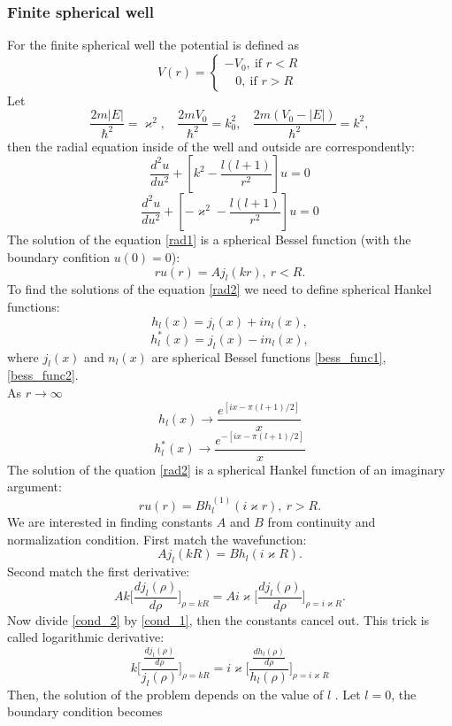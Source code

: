 \documentclass[a4paper, 12pt]{article}
\begin{document}
\subsubsection{Finite spherical well}
For the finite spherical well the  potential is defined as
$$V(r)=\begin{cases}
-V_0, ~\text{if } r< R\\
~~~~0, ~\text{if } r>R
\end{cases}$$
Let
$$\frac{2m|E|}{\hbar^2} = \varkappa^2, ~~~~\frac{2m V_0}{\hbar^2}=k_0^2, ~~~~\frac{2m(V_0-|E|)}{\hbar^2} =k^2,$$
then the radial equation inside of the well and outside are correspondently:
\begin{equation}\label{rad1}
	\frac{d^2 u}{du^2}+[k^2-\frac{l(l+1)}{r^2}]u=0
\end{equation}
\begin{equation}\label{rad2}
	\frac{d^2 u}{du^2}+[-\varkappa^2-\frac{l(l+1)}{r^2}]u=0
\end{equation}
The solution of the equation \eqref{rad1} is a spherical Bessel function (with the boundary confition $u(0) =0$):
$$r u(r) =A j_l(kr), ~r< R.$$
To find the solutions of the equation \eqref{rad2} we need to define spherical Hankel functions:
$$h_l(x) = j_l(x)+in_l(x),$$
$$h_l^*(x)=j_l(x)-in_l(x),$$
where $j_l(x)$ and $n_l(x)$ are spherical Bessel functions \eqref{bess_func1}, \eqref{bess_func2}.\\
As $r \to \infty$
$$h_l(x) \to \frac{e^{[ix-\pi (l+1)/2]}}{x}$$
$$h_l^*(x) \to \frac{e^{-[ix-\pi (l+1)/2]}}{x}$$
The solution of the quation \eqref{rad2} is a spherical Hankel function of an imaginary argument:
$$r u(r) = B h_l^{(1)}(i \varkappa r), ~r>R.$$
We are interested in finding constants $A$ and $B$ from continuity and normalization condition. First match the wavefunction:
\begin{equation}\label{cond_1}
	A j_l(kR)=B h_l(i \varkappa R).
\end{equation}
Second match the first derivative:
\begin{equation}\label{cond_2}
	A k \bigg[\frac{d j_l(\rho)}{d\rho}\bigg]_{\rho = kR} = A i \varkappa \bigg[\frac{d j_l(\rho)}{d\rho}\bigg]_{\rho = i \varkappa R}.
\end{equation}
Now divide \eqref{cond_2} by \eqref{cond_1}, then the constants cancel out. This trick is called logarithmic derivative:
$$k\bigg[ \frac{\frac{d j_l(\rho)}{d \rho}}{j_l(\rho)} \bigg]_{\rho = kR} = i\varkappa \bigg[ \frac{\frac{d h_l(\rho)}{d \rho}}{h_l(\rho)} \bigg]_{\rho = i \varkappa R} $$
 Then, the solution of the problem depends on the value of $l$ . Let $l=0$, the boundary condition becomes
\end{document}
